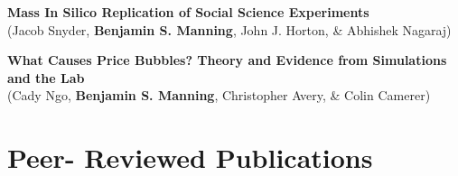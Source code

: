 \documentclass[margin,line,pifont,palatino,courier, 9pt]{res}
\begin{document}
\begin{resume}

{\bf Mass In Silico Replication of Social Science Experiments}\\
(Jacob Snyder\footnotemark[\value{footnote}], \textbf{Benjamin S. Manning}\footnotemark[\value{footnote}], John J. Horton\footnotemark[\value{footnote}], \& Abhishek Nagaraj\footnotemark[\value{footnote}])

{\bf What Causes Price Bubbles? Theory and Evidence from Simulations and the Lab}\\
(Cady Ngo\footnotemark[\value{footnote}], \textbf{Benjamin S. Manning}\footnotemark[\value{footnote}], Christopher Avery\footnotemark[\value{footnote}], \& Colin Camerer\footnotemark[\value{footnote}])

\section{\sc Peer- Reviewed Publications}


\end{resume}
\end{document}
